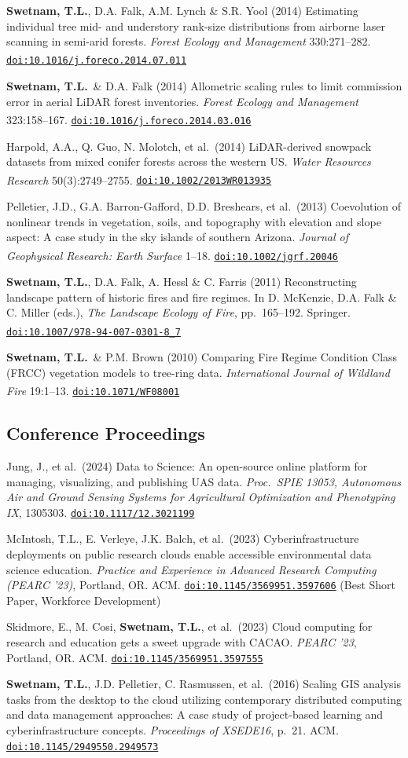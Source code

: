 \documentclass[11pt,letterpaper]{article}
\newcommand{\me}{\textbf{Swetnam, T.L.}}
\newcommand{\doi}[1]{\href{https://doi.org/#1}{\nolinkurl{doi:#1}}}
\newcommand{\grad}{\textsuperscript{\color{muted}\,\dag}}
\newcommand{\note}[1]{{\small\color{muted}#1}}
\newcounter{revno}
\newenvironment{revlist}[1]
  {\setcounter{revno}{#1}\stepcounter{revno}%
   \begin{list}{}{\setlength{\leftmargin}{2.1em}\setlength{\labelwidth}{1.7em}%
     \setlength{\labelsep}{0.4em}\setlength{\itemsep}{3.5pt}\setlength{\parsep}{0pt}\setlength{\topsep}{2pt}}}
  {\end{list}}
\newcommand{\pub}{\addtocounter{revno}{-1}\item[{\small\color{muted}\arabic{revno}.}]}
\newenvironment{hanglist}
  {\begin{list}{}{\setlength{\leftmargin}{1.4em}\setlength{\itemindent}{-1.4em}%
     \setlength{\itemsep}{3pt}\setlength{\parsep}{0pt}\setlength{\topsep}{1pt}}}
  {\end{list}}
\begin{document}
\begin{revlist}{40}
\pub \me, D.A. Falk, A.M. Lynch \& S.R. Yool (2014) Estimating individual tree mid- and understory rank-size distributions from airborne laser scanning in semi-arid forests. \textit{Forest Ecology and Management} 330:271--282. \doi{10.1016/j.foreco.2014.07.011}\grad
\pub \me\ \& D.A. Falk (2014) Allometric scaling rules to limit commission error in aerial LiDAR forest inventories. \textit{Forest Ecology and Management} 323:158--167. \doi{10.1016/j.foreco.2014.03.016}\grad
\pub Harpold, A.A., Q. Guo, N. Molotch, et al.\ (2014) LiDAR-derived snowpack datasets from mixed conifer forests across the western US. \textit{Water Resources Research} 50(3):2749--2755. \doi{10.1002/2013WR013935}\grad
\pub Pelletier, J.D., G.A. Barron-Gafford, D.D. Breshears, et al.\ (2013) Coevolution of nonlinear trends in vegetation, soils, and topography with elevation and slope aspect: A case study in the sky islands of southern Arizona. \textit{Journal of Geophysical Research: Earth Surface} 1--18. \doi{10.1002/jgrf.20046}\grad
\pub \me, D.A. Falk, A. Hessl \& C. Farris (2011) Reconstructing landscape pattern of historic fires and fire regimes. In D. McKenzie, D.A. Falk \& C. Miller (eds.), \textit{The Landscape Ecology of Fire}, pp.\ 165--192. Springer. \doi{10.1007/978-94-007-0301-8_7}\grad
\pub \me\ \& P.M. Brown (2010) Comparing Fire Regime Condition Class (FRCC) vegetation models to tree-ring data. \textit{International Journal of Wildland Fire} 19:1--13. \doi{10.1071/WF08001}\grad
\end{revlist}

\subsection{Conference Proceedings}
\begin{hanglist}
\item Jung, J., et al.\ (2024) Data to Science: An open-source online platform for managing, visualizing, and publishing UAS data. \textit{Proc.\ SPIE 13053, Autonomous Air and Ground Sensing Systems for Agricultural Optimization and Phenotyping IX}, 1305303. \doi{10.1117/12.3021199}
\item McIntosh, T.L., E. Verleye, J.K. Balch, et al.\ (2023) Cyberinfrastructure deployments on public research clouds enable accessible environmental data science education. \textit{Practice and Experience in Advanced Research Computing (PEARC '23)}, Portland, OR. ACM. \doi{10.1145/3569951.3597606} \note{(Best Short Paper, Workforce Development)}
\item Skidmore, E., M. Cosi, \me, et al.\ (2023) Cloud computing for research and education gets a sweet upgrade with CACAO. \textit{PEARC '23}, Portland, OR. ACM. \doi{10.1145/3569951.3597555}
\item \me, J.D. Pelletier, C. Rasmussen, et al.\ (2016) Scaling GIS analysis tasks from the desktop to the cloud utilizing contemporary distributed computing and data management approaches: A case study of project-based learning and cyberinfrastructure concepts. \textit{Proceedings of XSEDE16}, p.\ 21. ACM. \doi{10.1145/2949550.2949573}
\end{hanglist}
\end{document}
